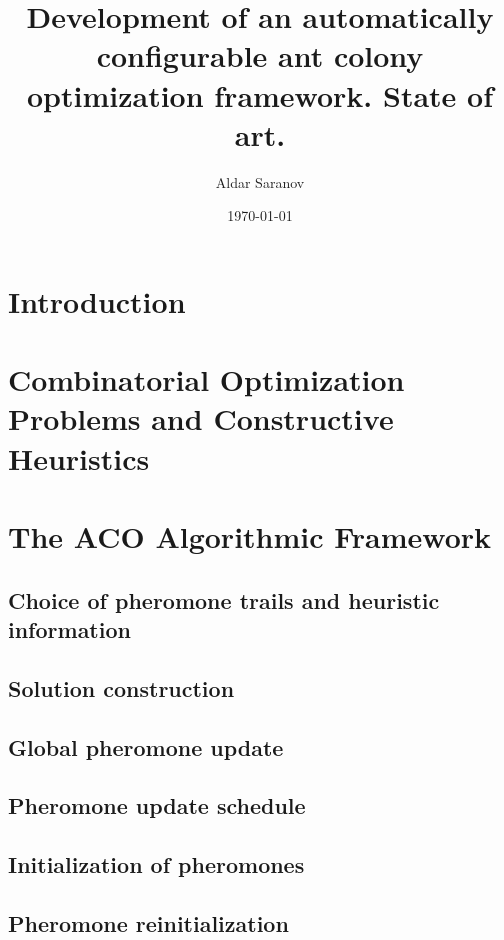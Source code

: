 \documentclass[12pt]{article}
\author{Aldar Saranov}
\date{\today}
\title{Development of an automatically configurable ant colony optimization framework. State of art.}
\begin{document}
\maketitle 
\newpage

\tableofcontents
\newpage

\begin{abstract}

\end{abstract}

\section{Introduction}

\section{Combinatorial Optimization Problems and Constructive
Heuristics}

\section{The ACO Algorithmic Framework}

\subsection{Choice of pheromone trails and heuristic information}

\subsection{Solution construction}

\subsection{Global pheromone update}

\subsection{Pheromone update schedule}

\subsection{Initialization of pheromones}

\subsection{Pheromone reinitialization}
\end{document}
